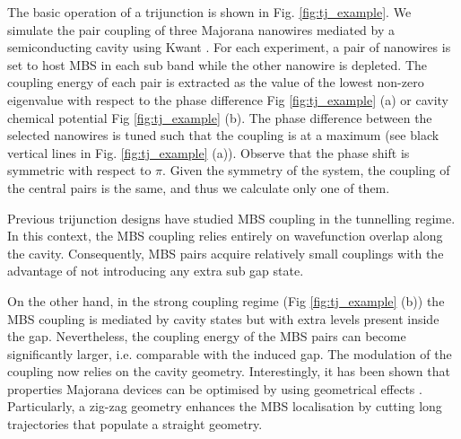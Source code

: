 The basic operation of a trijunction is shown in Fig. \ref{fig:tj_example}.
We simulate the pair coupling of three Majorana nanowires mediated by a semiconducting cavity using Kwant \cite{Groth2014}.
For each experiment, a pair of nanowires is set to host MBS in each sub band while the other nanowire is depleted.
The coupling energy of each pair is extracted as the value of the lowest non-zero eigenvalue with respect to the phase difference Fig \ref{fig:tj_example} (a) or cavity chemical potential Fig \ref{fig:tj_example} (b).
The phase difference between the selected nanowires is tuned such that the coupling is at a maximum (see black vertical lines in Fig. \ref{fig:tj_example} (a)).
Observe that the phase shift is symmetric with respect to $\pi$.
Given the symmetry of the system, the coupling of the central pairs is the same, and thus we calculate only one of them.

Previous trijunction designs \cite{Hell2017} have studied MBS coupling in the tunnelling regime.
In this context, the MBS coupling relies entirely on wavefunction overlap along the cavity. 
Consequently, MBS pairs acquire relatively small couplings with the advantage of not introducing any extra sub gap state.

On the other hand, in the strong coupling regime (Fig \ref{fig:tj_example} (b)) the MBS coupling is mediated by cavity states but with extra levels present inside the gap.
Nevertheless, the coupling energy of the MBS pairs can become significantly larger, i.e. comparable with the induced gap.
The modulation of the coupling now relies on the cavity geometry.
Interestingly, it has been shown that properties Majorana devices can be optimised by using geometrical effects \cite{Laeven2019}.
Particularly, a zig-zag geometry enhances the MBS localisation by cutting long trajectories that populate a straight geometry.



